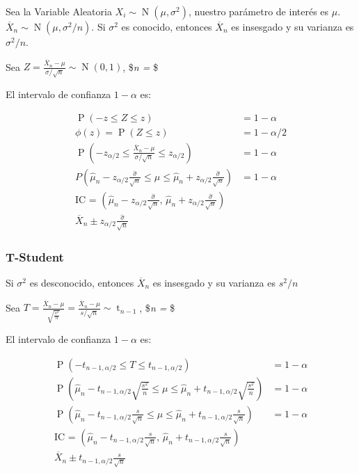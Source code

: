 \documentclass[
]{article}
\begin{document}
Sea la Variable Aleatoria \(X_i \sim \operatorname{N}(\mu, \sigma^2)\),
nuestro parámetro de interés es \(\mu\).
\(\overline{X}_n \sim \operatorname{N}(\mu, \sigma^2/n)\). Si
\(\sigma^2\) es conocido, entonces \(\overline{X}_n\) es insesgado y su
varianza es \(\sigma^2/n\).

Sea
\(Z = \frac{\overline{X}_{n} - \mu}{\sigma/\sqrt{n}} \sim \operatorname{N}(0, 1)\),
\$\hat{\mu}\emph{n =}  \$

El intervalo de confianza \(1-\alpha\) es:

\[
\begin{align*}
    \operatorname{P}(-z \leq Z \leq z) & = 1 - \alpha \\
    \phi(z) =  \operatorname{P}(Z \leq z) & = 1 - \alpha/2 \\
    \operatorname{P}(-z_{\alpha/2} \leq \frac{\overline{X}_{n} - \mu}{\sigma/\sqrt{n}} \leq z_{\alpha/2}) & = 1 - \alpha \\
    P(\hat{\mu}_n - z_{\alpha/2} \frac{\hat{\sigma}}{\sqrt{n}} \leq \mu \leq \hat{\mu}_n + z_{\alpha/2} \frac{\hat{\sigma}}{\sqrt{n}}) & = 1 - \alpha \\
    \text{IC = }(\hat{\mu}_n - z_{\alpha/2} \frac{\hat{\sigma}}{\sqrt{n}} \text{, } \hat{\mu}_n + z_{\alpha/2} \frac{\hat{\sigma}}{\sqrt{n}}) \\
    \overline{X}_{n} \pm z_{\alpha/2} \frac{\hat{\sigma}}{\sqrt{n}}
\end{align}
\]

\hypertarget{t-student}{%
\subsubsection{T-Student}\label{t-student}}

Si \(\sigma^2\) es desconocido, entonces \(\overline{X}_n\) es insesgado
y su varianza es \(s^2/n\)

Sea
\(T = \frac{\overline{X}_{n} - \mu}{\sqrt{\frac{s^2}{n}}} = \frac{\overline{X}_{n} - \mu}{s/\sqrt{n}} \sim \operatorname{t}_{n-1}\),
\$\hat{\mu}\emph{n =}  \$

El intervalo de confianza \(1-\alpha\) es:

\[
\begin{align*}
    \operatorname{P}(-t_{n-1,\alpha/2} \leq T \leq t_{n-1,\alpha/2}) & = 1 - \alpha \\
    \operatorname{P}(\hat{\mu}_n - t_{n-1,\alpha/2} \sqrt{\frac{s^2}{n}} \leq \mu \leq \hat{\mu}_n + t_{n-1,\alpha/2} \sqrt{\frac{s^2}{n}}) & = 1 - \alpha \\
    \operatorname{P}(\hat{\mu}_n - t_{n-1,\alpha/2} \frac{s}{\sqrt{n}} \leq \mu \leq \hat{\mu}_n + t_{n-1,\alpha/2} \frac{s}{\sqrt{n}}) & = 1 - \alpha \\
    \text{IC = }(\hat{\mu}_n - t_{n-1,\alpha/2} \frac{s}{\sqrt{n}} \text{, } \hat{\mu}_n + t_{n-1,\alpha/2} \frac{s}{\sqrt{n}}) \\
    \overline{X}_{n} \pm t_{n-1,\alpha/2} \frac{s}{\sqrt{n}}
\end{align*}
\]
\end{document}
